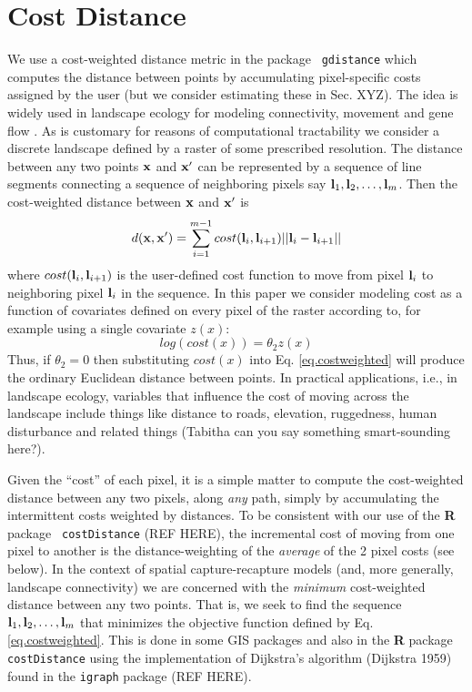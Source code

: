 \section{Cost Distance}

We use a cost-weighted distance metric in the package \mbox{\tt
gdistance}  which computes the distance 
between points by accumulating pixel-specific costs assigned by the user 
(but we consider estimating these in Sec. XYZ). The idea is widely used in
landscape ecology for modeling connectivity, movement and gene flow
\citep{adriaensen_etal:2003,mcrae_etal:2008}. As is customary for reasons of
computational tractability we consider a discrete landscape defined by a 
raster of some prescribed resolution. The distance between any two points 
${\bf x}$ and ${\bf x}'$ can be represented by a sequence of line segments 
connecting a sequence of neighboring  pixels say 
${\bf l}_{1},{\bf l}_{2},\ldots,{\bf l}_{m}$. Then the cost-weighted distance 
between ${\bf x}$ and ${\bf x}'$ is
\begin{equation}
 d({\bf x},{\bf x}')
  =  \sum_{i=1}^{m-1} cost({\bf l}_{i},{\bf l}_{i+1})||{\bf l}_{i} - {\bf l}_{i+1}||
\label{eq.costweighted}
\end{equation}
where $cost({\bf l}_{i},{\bf l}_{i+1})$ is the user-defined cost function
to move 
from pixel ${\bf l}_{i}$ to neighboring pixel ${\bf l}_{i}$ in the sequence.
In this paper we consider modeling cost as a function of covariates
defined on every pixel of the raster according to, for example using a
single
covariate $z(x)$:
\begin{equation}
 log(cost(x))=  \theta_{2} z(x) 
\label{eq.cost}
\end{equation}
Thus, if $\theta_{2} = 0$ then substituting $cost(x)$ into
Eq. \ref{eq.costweighted} will produce the ordinary Euclidean distance
between points. 
In practical applications, i.e., in landscape ecology, variables that
influence the cost of moving across the landscape include things like
distance to roads, elevation, ruggedness, human disturbance and
related things (Tabitha can you say something smart-sounding here?).

Given the ``cost'' of each pixel, it is a simple matter to compute the
cost-weighted distance between any two pixels, along {\it any} path,
simply by accumulating the intermittent costs weighted by distances. 
To be consistent with our use of the {\bf R} package \mbox{\tt
  costDistance} (REF HERE),
the incremental cost of moving from one pixel to another is the
distance-weighting of the {\it average} of the 2 pixel costs (see below).
In the context of spatial capture-recapture models (and, more
generally, landscape connectivity) we are concerned with the {\it
  minimum} cost-weighted distance between any two points.  That is, we
seek to find the 
sequence ${\bf l}_{1},{\bf l}_{2},\ldots,{\bf l}_{m}$ that minimizes
the objective function defined by Eq. \ref{eq.costweighted}.
This is done in some GIS packages and also in the {\bf R} package
\mbox{\tt costDistance} using the implementation of Dijkstra's algorithm (Dijkstra 1959)
found in the \mbox{\tt igraph} package (REF HERE).


